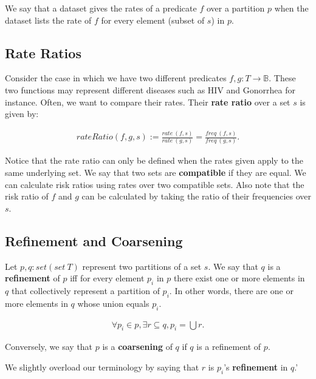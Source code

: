 \documentclass[]{article}
\begin{document}
We say that a dataset gives the rates of a predicate \(f\) over a
partition \(p\) when the dataset lists the rate of \(f\) for every
element (subset of \(s\)) in \(p\).

\hypertarget{rate-ratios}{%
\subsection{Rate Ratios}\label{rate-ratios}}

Consider the case in which we have two different predicates
\(f, g: T \rightarrow \mathbb{B}\). These two functions may represent
different diseases such as HIV and Gonorrhea for instance. Often, we
want to compare their rates. Their \textbf{rate ratio} over a set \(s\)
is given by:

\begin{align*}
rateRatio (f, g, s) := \frac{rate\ (f, s)}{rate\ (g, s)} = \frac{freq\ (f, s)}{freq\ (g, s)}.
\end{align*}

Notice that the rate ratio can only be defined when the rates given
apply to the same underlying set. We say that two sets are
\textbf{compatible} if they are equal. We can calculate risk ratios
using rates over two compatible sets. Also note that the risk ratio of
\(f\) and \(g\) can be calculated by taking the ratio of their
frequencies over \(s\).

\hypertarget{refinement-and-coarsening}{%
\subsection{Refinement and Coarsening}\label{refinement-and-coarsening}}

Let \(p, q : set (set\ T)\) represent two partitions of a set \(s\). We
say that \(q\) is a \textbf{refinement} of \(p\) iff for every element
\(p_i\) in \(p\) there exist one or more elements in \(q\) that
collectively represent a partition of \(p_i\). In other words, there are
one or more elements in \(q\) whose union equals \(p_i\).

\begin{align*}
\forall p_i \in p, \exists r \subseteq q, p_i = \bigcup r. 
\end{align*}

Conversely, we say that \(p\) is a \textbf{coarsening} of \(q\) if \(q\)
is a refinement of \(p\).

We slightly overload our terminology by saying that \(r\) is \(p_i\)'s
\textbf{refinement} in \(q\).'
\end{document}
